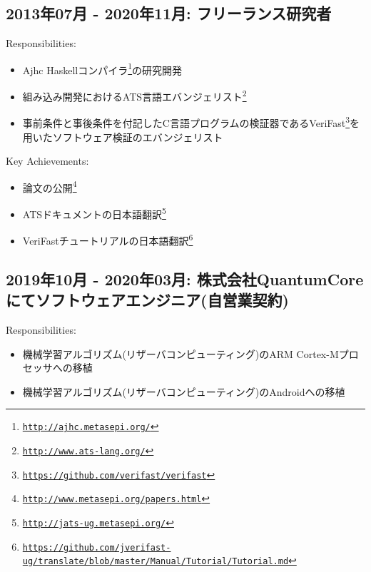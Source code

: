 \documentclass[letterpaper]{article}
\begin{document}
\subsection*{2013年07月 - 2020年11月: フリーランス研究者}

\noindent Responsibilities:

\begin{itemize}
  \item Ajhc Haskellコンパイラ\footnote{\href{http://ajhc.metasepi.org/}{\tt http://ajhc.metasepi.org/}}の研究開発
  \item 組み込み開発におけるATS言語エバンジェリスト\footnote{\href{http://www.ats-lang.org/}{\tt http://www.ats-lang.org/}}
  \item 事前条件と事後条件を付記したC言語プログラムの検証器であるVeriFast\footnote{\href{https://github.com/verifast/verifast}{\tt https://github.com/verifast/verifast}}を用いたソフトウェア検証のエバンジェリスト
\end{itemize}

\noindent Key Achievements:

\begin{itemize}
  \item 論文の公開\footnote{\href{http://www.metasepi.org/papers.html}{\tt http://www.metasepi.org/papers.html}}
  \item ATSドキュメントの日本語翻訳\footnote{\href{http://jats-ug.metasepi.org/}{\tt http://jats-ug.metasepi.org/}}
  \item VeriFastチュートリアルの日本語翻訳\footnote{\href{https://github.com/jverifast-ug/translate/blob/master/Manual/Tutorial/Tutorial.md}{\tt https://github.com/jverifast-ug/translate/blob/master/Manual/Tutorial/Tutorial.md}}
\end{itemize}

\subsection*{2019年10月 - 2020年03月: 株式会社QuantumCore にてソフトウェアエンジニア(自営業契約)}

\noindent Responsibilities:

\begin{itemize}
  \item 機械学習アルゴリズム(リザーバコンピューティング)のARM Cortex-Mプロセッサへの移植
  \item 機械学習アルゴリズム(リザーバコンピューティング)のAndroidへの移植
\end{itemize}
\end{document}
